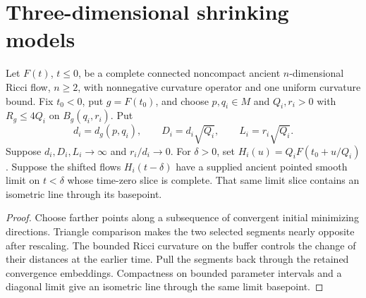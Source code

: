 \section{Three-dimensional shrinking models}

\begin{lemma}
\label{lem:ancient-geometric-selected-line}
Let $F(t)$, $t\leq0$, be a complete connected noncompact ancient
$n$-dimensional Ricci flow, $n\geq2$, with nonnegative curvature
operator and one uniform curvature bound. Fix $t_0<0$, put
$g=F(t_0)$, and choose $p,q_i\in M$ and $Q_i,r_i>0$ with
$R_g\leq4Q_i$ on $B_g(q_i,r_i)$. Put
\[
 d_i=d_g(p,q_i),\qquad D_i=d_i\sqrt{Q_i},
 \qquad L_i=r_i\sqrt{Q_i}.
\]
Suppose $d_i,D_i,L_i\to\infty$ and $r_i/d_i\to0$.
For $\delta>0$, set $H_i(u)=Q_iF(t_0+u/Q_i)$.
Suppose the shifted flows $H_i(t-\delta)$ have a supplied ancient
pointed smooth limit on $t<\delta$ whose time-zero slice is complete.
That same limit slice contains an isometric line through its basepoint.
\end{lemma}
\begin{proof}
Choose farther points along a subsequence of convergent initial minimizing
directions. Triangle comparison makes the two selected segments nearly
opposite after rescaling. The bounded Ricci curvature on the buffer controls
the change of their distances at the earlier time. Pull the segments back
through the retained convergence embeddings. Compactness on bounded parameter
intervals and a diagonal limit give an isometric line through the same limit
basepoint.
\end{proof}

